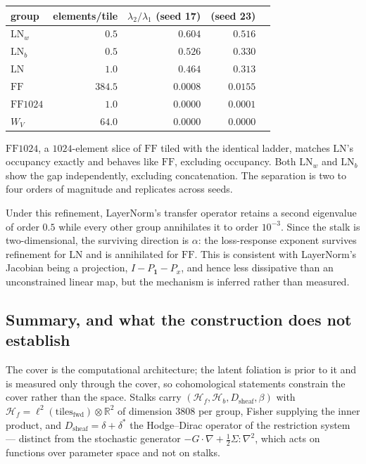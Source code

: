 \begin{center}
\begin{tabular}{lrrrr}
\toprule
group & elements/tile & $\lambda_2/\lambda_1$ (seed 17) & (seed 23) \\
\midrule
$\mathrm{LN}_w$ & $0.5$ & $0.604$ & $0.516$ \\
$\mathrm{LN}_b$ & $0.5$ & $0.526$ & $0.330$ \\
$\mathrm{LN}$   & $1.0$ & $0.464$ & $0.313$ \\
$\mathrm{FF}$   & $384.5$ & $0.0008$ & $0.0155$ \\
$\mathrm{FF}1024$ & $1.0$ & $0.0000$ & $0.0001$ \\
$W_V$           & $64.0$ & $0.0000$ & $0.0000$ \\
\bottomrule
\end{tabular}
\end{center}

$\mathrm{FF}1024$, a $1024$-element slice of $\mathrm{FF}$ tiled with the
identical ladder, matches $\mathrm{LN}$'s occupancy exactly and behaves like
$\mathrm{FF}$, excluding occupancy. Both $\mathrm{LN}_w$ and $\mathrm{LN}_b$
show the gap independently, excluding concatenation. The separation is two to
four orders of magnitude and replicates across seeds.

\begin{observation}
Under this refinement, LayerNorm's transfer operator retains a second
eigenvalue of order $0.5$ while every other group annihilates it to order
$10^{-3}$. Since the stalk is two-dimensional, the surviving direction is
$\alpha$: the loss-response exponent survives refinement for $\mathrm{LN}$ and
is annihilated for $\mathrm{FF}$. This is consistent with LayerNorm's Jacobian
being a projection, $I - P_{\mathbf 1} - P_x$, and hence less dissipative than
an unconstrained linear map, but the mechanism is inferred rather than measured.
\end{observation}

\subsection{Summary, and what the construction does not establish}

The cover is the computational architecture; the latent foliation is prior to
it and is measured only through the cover, so cohomological statements
constrain the cover rather than the space. Stalks carry
$(\mathcal{H}_f,\mathcal{H}_b,D_{\text{sheaf}},\beta)$ with
$\mathcal{H}_f = \ell^2(\text{tiles}_{\text{fwd}})\otimes\mathbb{R}^2$ of
dimension $3808$ per group, Fisher supplying the inner product, and
$D_{\text{sheaf}} = \delta+\delta^{*}$ the Hodge--Dirac operator of the
restriction system --- distinct from the stochastic generator
$-G\cdot\nabla+\tfrac12\Sigma\!:\!\nabla^2$, which acts on functions over
parameter space and not on stalks.

